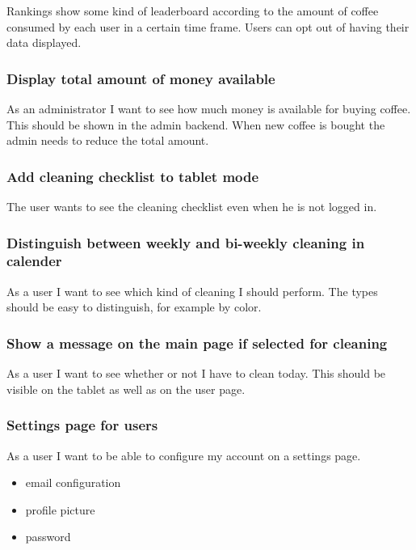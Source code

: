 Rankings show some kind of leaderboard according to the amount of coffee
consumed by each user in a certain time frame. Users can opt out of
having their data displayed.

\subsubsection*{Display total amount of money available}

As an administrator I want to see how much money is available for buying
coffee. This should be shown in the admin backend. When new coffee is
bought the admin needs to reduce the total amount.

\subsubsection*{Add cleaning checklist to tablet mode}

The user wants to see the cleaning checklist even when he is not logged
in.

\subsubsection*{Distinguish between weekly and bi-weekly cleaning in calender}

As a user I want to see which kind of cleaning I should perform. The
types should be easy to distinguish, for example by color.

\subsubsection*{Show a message on the main page if selected for cleaning}

As a user I want to see whether or not I have to clean today. This
should be visible on the tablet as well as on the user page.

\subsubsection*{Settings page for users}

As a user I want to be able to configure my account on a settings page.

\begin{itemize}
\item email configuration
\item profile picture
\item password
\end{itemize}

